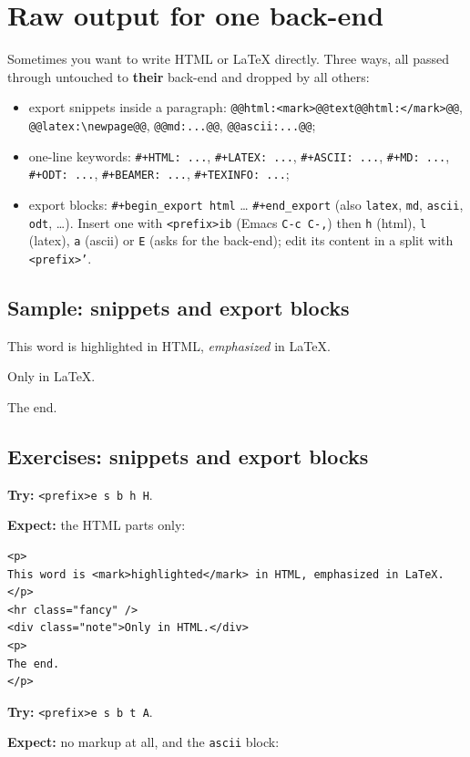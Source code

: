 \section{Raw output for one back-end}
\label{sec:org59c8980}
Sometimes you want to write HTML or \LaTeX{} directly. Three ways, all passed
through untouched to \textbf{their} back-end and dropped by all others:
\begin{itemize}
\item export snippets inside a paragraph: \texttt{@@html:<mark>@@text@@html:</mark>@@},
\texttt{@@latex:\textbackslash{}newpage@@}, \texttt{@@md:...@@}, \texttt{@@ascii:...@@};
\item one-line keywords: \texttt{\#+HTML: ...}, \texttt{\#+LATEX: ...}, \texttt{\#+ASCII: ...},
\texttt{\#+MD: ...}, \texttt{\#+ODT: ...}, \texttt{\#+BEAMER: ...}, \texttt{\#+TEXINFO: ...};
\item export blocks: \texttt{\#+begin\_export html} \ldots{} \texttt{\#+end\_export} (also \texttt{latex},
\texttt{md}, \texttt{ascii}, \texttt{odt}, \ldots{}). Insert one with \texttt{<prefix>ib} (Emacs
\texttt{C-c C-,}) then \texttt{h} (html), \texttt{l} (latex), \texttt{a} (ascii) or \texttt{E} (asks for
the back-end); edit its content in a split with \texttt{<prefix>'}.
\end{itemize}
\subsection{Sample: snippets and export blocks}
\label{sec:orgc0a76d1}
This word is highlighted in HTML, \emph{emphasized} in \LaTeX{}.
\newpage
\begin{center}Only in \LaTeX.\end{center}
The end.
\subsection{Exercises: snippets and export blocks}
\label{sec:orgdbb46a5}
\textbf{Try:} \texttt{<prefix>e s b h H}.

\textbf{Expect:} the HTML parts only:

\begin{verbatim}
<p>
This word is <mark>highlighted</mark> in HTML, emphasized in LaTeX.
</p>
<hr class="fancy" />
<div class="note">Only in HTML.</div>
<p>
The end.
</p>
\end{verbatim}

\textbf{Try:} \texttt{<prefix>e s b t A}.

\textbf{Expect:} no markup at all, and the \texttt{ascii} block:

